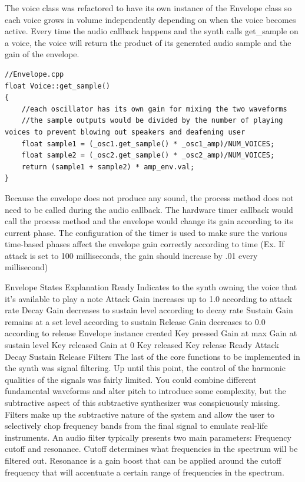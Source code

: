 \documentclass[acmlarge,screen]{acmart}
\begin{document}
The voice class was refactored to have its own instance of the Envelope class so each voice grows in volume independently depending on when the voice becomes active. Every time the audio callback happens and the synth calls get\_sample on a voice, the voice will return the product of its generated audio sample and the gain of the envelope.

\begin{lstlisting}
//Envelope.cpp
float Voice::get_sample()
{   
	//each oscillator has its own gain for mixing the two waveforms
	//the sample outputs would be divided by the number of playing voices to prevent blowing out speakers and deafening user
	float sample1 = (_osc1.get_sample() * _osc1_amp)/NUM_VOICES; 
	float sample2 = (_osc2.get_sample() * _osc2_amp)/NUM_VOICES;
	return (sample1 + sample2) * amp_env.val;
}
\end{lstlisting}
Because the envelope does not produce any sound, the process method does not need to be called during the audio callback. The hardware timer callback would call the process method and the envelope would change its gain according to its current phase. The configuration of the timer is used to make sure the various time-based phases affect the envelope gain correctly according to time (Ex. If attack is set to 100 milliseconds, the gain should increase by .01 every millisecond)

Envelope States	Explanation
Ready	Indicates to the synth owning the voice that it's available to play a note
Attack	Gain increases up to 1.0 according to attack rate
Decay	Gain decreases to sustain level according to decay rate
Sustain	Gain remains at a set level according to sustain
Release	Gain decreases to 0.0 according to release
Envelope instance created
Key pressed
Gain at max
Gain at sustain level
Key released
Gain at 0
Key released
Key release
Ready
Attack
Decay
Sustain
Release
Filters
The last of the core functions to be implemented in the synth was signal filtering. Up until this point, the control of the harmonic qualities of the signals was fairly limited. You could combine different fundamental waveforms and alter pitch to introduce some complexity, but the subtractive aspect of this subtractive synthesizer was conspicuously missing. Filters make up the subtractive nature of the system and allow the user to selectively chop frequency bands from the final signal to emulate real-life instruments. An audio filter typically presents two main parameters: Frequency cutoff and resonance. Cutoff determines what frequencies in the spectrum will be filtered out. Resonance is a gain boost that can be applied around the cutoff frequency that will accentuate a certain range of frequencies in the spectrum.
\end{document}
